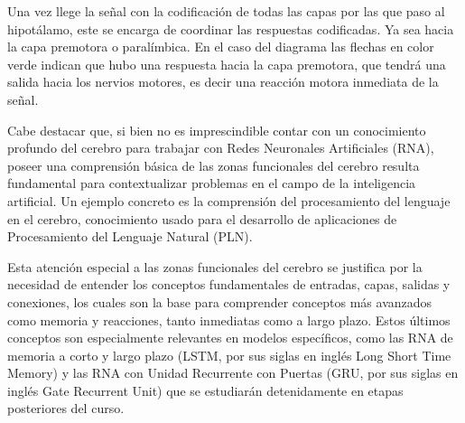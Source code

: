 Una vez llege la señal con la codificación de todas las capas por las que paso al hipotálamo, este se encarga de coordinar las respuestas codificadas. Ya sea hacia la capa premotora o paralímbica. En el caso del diagrama las flechas en color verde indican que hubo una respuesta hacia la capa premotora, que tendrá una salida hacia los nervios motores, es decir una reacción motora inmediata de la señal. 


Cabe destacar que, si bien no es imprescindible contar con un conocimiento profundo del cerebro para trabajar con Redes Neuronales Artificiales (RNA), poseer una comprensión básica de las zonas funcionales del cerebro resulta fundamental para contextualizar problemas en el campo de la inteligencia artificial. Un ejemplo concreto es la comprensión del procesamiento del lenguaje en el cerebro, conocimiento usado para el desarrollo de aplicaciones de Procesamiento del Lenguaje Natural (PLN).

Esta atención especial a las zonas funcionales del cerebro se justifica por la necesidad de entender los conceptos fundamentales de entradas, capas, salidas y conexiones, los cuales son la base para comprender conceptos más avanzados como memoria y reacciones, tanto inmediatas como a largo plazo. Estos últimos conceptos son especialmente relevantes en modelos específicos, como las RNA de memoria a corto y largo plazo (LSTM, por sus siglas en inglés Long Short Time Memory) y las RNA con Unidad Recurrente con Puertas (GRU, por sus siglas en inglés Gate Recurrent Unit)  que se estudiarán detenidamente en etapas posteriores del curso.







